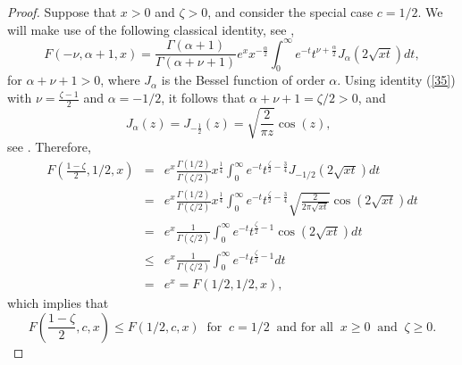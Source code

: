 \begin{proof}
Suppose that $x>0$ and $\zeta>0$, and consider the special case $c=1/2$.
We will make use of the following classical identity, see
\cite[p. 1085, \#9.211-3]{GR},
\begin{equation}\label{35}
F(-\nu,\alpha+1,x)=\frac{\Gamma(\alpha+1)}{\Gamma(\alpha+\nu+1)}
e^x x^{-\frac{\alpha}{2}} \int_0^\infty e^{-t}
t^{\nu+\frac{\alpha}{2}} J_\alpha (2\sqrt{xt}) dt,
\end{equation}
for $\alpha+\nu+1>0$, where $J_\alpha$ is the Bessel function of order
$\alpha$.  Using identity (\ref{35}) with $\nu=\frac{\zeta-1}{2}$ and
$\alpha=-1/2$, it follows that $\alpha+\nu+1=\zeta/2>0$, and
$$
J_\alpha(z)=J_{-\frac{1}{2}}(z)=\sqrt{\frac{2}{\pi z}}\cos(z),\;\;
$$
see \cite[p.\ 977, \#8.464-2]{GR}. Therefore,
\begin{eqnarray*}
F\left(\frac{1-\zeta}{2},1/2,x\right) & = &
e^x\frac{\Gamma(1/2)}{\Gamma(\zeta/2)} x^{\frac{1}{4}}
\int_0^\infty e^{-t}t^{\frac{\zeta}{2}-\frac{3}{4}}
J_{-1/2}(2\sqrt{xt}) dt \\[1ex]
& = & e^x\frac{\Gamma(1/2)}{\Gamma(\zeta/2)} x^{\frac{1}{4}}
\int_0^\infty e^{-t}t^{\frac{\zeta}{2}-\frac{3}{4}}
\sqrt{\frac{2}{2\pi\sqrt{xt}}}\cos(2\sqrt{xt}) dt \\[1ex]
& = & e^x\frac{1}{\Gamma(\zeta/2)}\int_0^\infty e^{-t}
t^{\frac{\zeta}{2}-1}\cos(2\sqrt{xt}) dt \\[1ex]
& \leq & e^x\frac{1}{\Gamma(\zeta/2)}\int_0^\infty e^{-t}
t^{\frac{\zeta}{2}-1} dt \\[1ex]
& = & e^x = F(1/2,1/2,x),
\end{eqnarray*}
which implies that
\begin{equation} \label{36}
F\left(\frac{1-\zeta}{2},c,x\right)\leq F(1/2,c,x)\;\;
\mbox{for}\;\; c=1/2\;\; \mbox{and for all}\;\; x\geq 0\;\;
\mbox{and}\;\; \zeta\geq 0.
\end{equation}


\end{proof}
